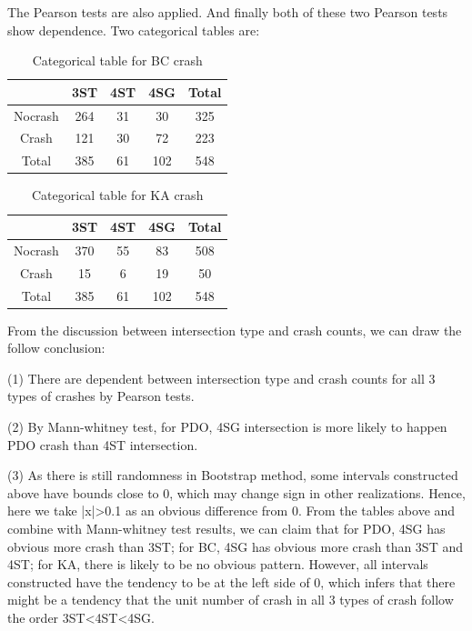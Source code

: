 \documentclass[11pt]{scrartcl} %
\begin{document}
The Pearson tests are also applied. And finally both of these two Pearson tests show dependence. Two categorical tables are:

\begin{table}[H]
\caption{Categorical table for BC crash}
\centering
\begin{tabular}{|c|c|c|c|c|}
\hline
      & 3ST & 4ST & 4SG & Total \\
\hline
Nocrash & 264 & 31  & 30 & 325 \\
\hline
Crash    & 121  & 30  & 72  & 223 \\
\hline
Total    & 385  & 61  & 102  & 548 \\
\hline
\end{tabular}
\end{table}

\begin{table}[H]
\caption{Categorical table for KA crash}
\centering
\begin{tabular}{|c|c|c|c|c|}
\hline
      & 3ST & 4ST & 4SG & Total \\
\hline
Nocrash & 370 & 55  & 83 & 508 \\
\hline
Crash    & 15  & 6  & 19  & 50 \\
\hline
Total    & 385  & 61  & 102  & 548 \\
\hline
\end{tabular}
\end{table}

From the discussion between intersection type and crash counts, we can draw the follow conclusion:

(1) There are dependent between intersection type and crash counts for all 3 types of crashes by Pearson tests.

(2) By Mann-whitney test, for PDO, 4SG intersection is more likely to happen PDO crash than 4ST intersection.

(3) As there is still randomness in Bootstrap method, some intervals constructed above have bounds close to 0, which may change sign in other realizations. Hence, here we take |x|>0.1 as an obvious difference from 0. From the tables above and combine with Mann-whitney test results, we can claim that for PDO, 4SG has obvious more crash than 3ST; for BC, 4SG has obvious more crash than 3ST and 4ST; for KA, there is likely to be no obvious pattern. However, all intervals constructed have the tendency to be at the left side of 0, which infers that there might be a tendency that the unit number of crash in all 3 types of crash follow the order 3ST<4ST<4SG.
\end{document}
